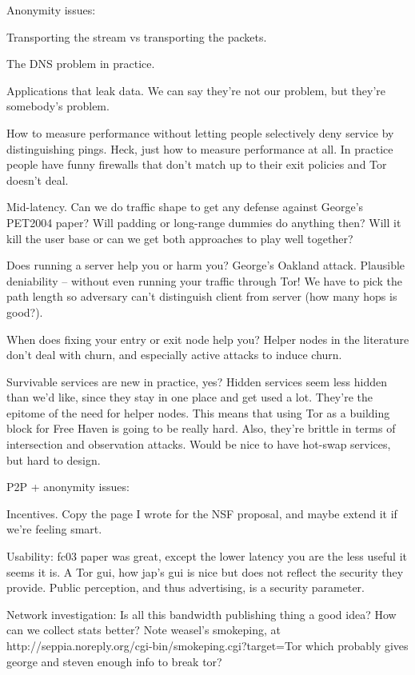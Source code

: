 Anonymity issues:

Transporting the stream vs transporting the packets.

The DNS problem in practice.

Applications that leak data. We can say they're not our problem, but
they're somebody's problem.

How to measure performance without letting people selectively deny service
by distinguishing pings. Heck, just how to measure performance at all. In
practice people have funny firewalls that don't match up to their exit
policies and Tor doesn't deal.

Mid-latency. Can we do traffic shape to get any defense against George's
PET2004 paper? Will padding or long-range dummies do anything then? Will
it kill the user base or can we get both approaches to play well together?

Does running a server help you or harm you? George's Oakland attack.
Plausible deniability -- without even running your traffic through Tor! We
have to pick the path length so adversary can't distinguish client from
server (how many hops is good?).

When does fixing your entry or exit node help you?
Helper nodes in the literature don't deal with churn, and
especially active attacks to induce churn.

Survivable services are new in practice, yes? Hidden services seem
less hidden than we'd like, since they stay in one place and get used
a lot. They're the epitome of the need for helper nodes. This means
that using Tor as a building block for Free Haven is going to be really
hard. Also, they're brittle in terms of intersection and observation
attacks. Would be nice to have hot-swap services, but hard to design.


P2P + anonymity issues:

Incentives. Copy the page I wrote for the NSF proposal, and maybe extend
it if we're feeling smart.

Usability: fc03 paper was great, except the lower latency you are the
less useful it seems it is.
A Tor gui, how jap's gui is nice but does not reflect the security
they provide.
Public perception, and thus advertising, is a security parameter.

Network investigation: Is all this bandwidth publishing thing a good idea?
How can we collect stats better? Note weasel's smokeping, at
http://seppia.noreply.org/cgi-bin/smokeping.cgi?target=Tor
which probably gives george and steven enough info to break tor?

